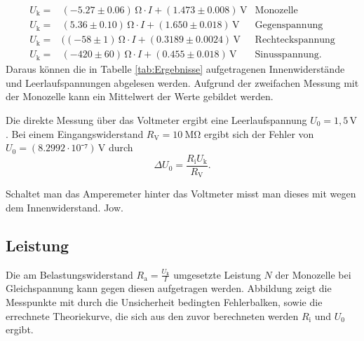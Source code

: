 \begin{align}
U_\mathup{k}=&(-5.27\pm0.06)\,\si{\ohm}\cdot I+(1.473\pm0.008)\,\si{\volt} &\text{Monozelle}\\
U_\mathup{k}=&(5.36\pm0.10)\,\si{\ohm}\cdot I+(1.650\pm0.018)\,\si{\volt} &\text{Gegenspannung}\\
U_\mathup{k}=&((-58\pm1)\,\si{\ohm}\cdot I+(0.3189\pm0.0024)\,\si{\volt} &\text{Rechteckspannung}\\
U_ \mathup{k}=&(-420\pm60)\,\si{\ohm}\cdot I +(0.455\pm0.018)\,\si{\volt} &\text{Sinusspannung}.
\end{align}
Daraus können die in Tabelle \ref{tab:Ergebnisse} aufgetragenen Innenwiderstände und Leerlaufspannungen abgelesen werden. Aufgrund der zweifachen Messung mit der Monozelle kann ein Mittelwert der Werte gebildet werden.

\newpage
Die direkte Messung über das Voltmeter ergibt eine Leerlaufspannung $U_0=1,5\,\si{\volt}$. Bei einem Eingangswiderstand $R_\mathup{V}=\SI{10}{\mega\ohm}$ ergibt sich der Fehler von $U_0=(8.2992\cdot10⁻⁷)\,\si{\volt}$ durch
\begin{equation}
\Delta{U_0}=\frac{R_\mathup{i}U_\mathup{k}}{R_\mathup{V}}.
\end{equation}

Schaltet man das Amperemeter hinter das Voltmeter misst man dieses mit wegen dem Innenwiderstand. Jow.
\newpage
\subsection{Leistung}

Die am Belastungswiderstand $R_\mathup{a}=\frac{U_\mathup{k}}{I}$ umgesetzte Leistung $N$ der Monozelle bei Gleichspannung kann gegen diesen aufgetragen werden. Abbildung zeigt die Messpunkte mit durch die Unsicherheit bedingten Fehlerbalken, sowie die errechnete Theoriekurve, die sich aus den zuvor berechneten werden $R_\mathup{i}$ und $U_0$ ergibt. 

